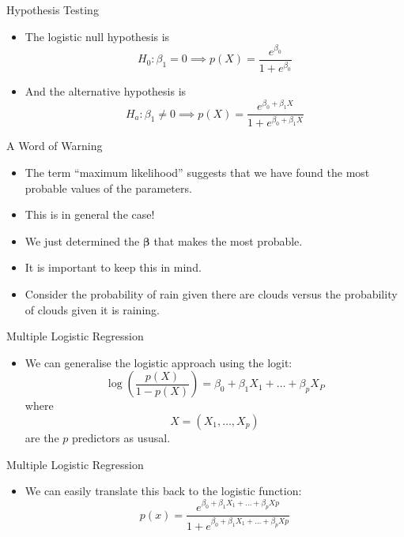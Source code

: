 \documentclass[mathserif, aspectratio=169]{beamer}
\begin{document}
\begin{frame}{Hypothesis Testing}
	\begin{itemize}
		\item The logistic null hypothesis is
			\[ H_0 : \beta_1 = 0 \implies p(X) = \frac{e^{\beta_0}}{1 + e^{\beta_0}} \]
		\item And the alternative hypothesis is
			\[ H_a : \beta_1 \neq 0 \implies p(X) = \frac{e^{\beta_0 + \beta_1 X}}
			{1 + e^{\beta_0 + \beta_1 X}} \]
	\end{itemize}
\end{frame}

\begin{frame}{A Word of Warning}
	\begin{itemize}
		\item The term ``maximum likelihood'' suggests that we have found the most probable values of 
			the parameters.
		\item This is in general  the case!
		\item We just determined the $\bm{\beta}$ that makes the  most probable.
		\item It is important to keep this in mind.
		\item Consider the probability of rain given there are clouds versus the probability of clouds
			given it is raining.
	\end{itemize}
\end{frame}


\begin{frame}{Multiple Logistic Regression}
	\begin{itemize}
		\item We can generalise the logistic approach using the logit:
			\[
				\log\left( \frac{p(X)}{1 - p(X)}\right) =
				\beta_0 + \beta_1 X_1 + \dots + \beta_p X_P
			\]
			where
			\[ X = (X_1, \dots, X_p) \]
			are the $p$ predictors as ususal.
	\end{itemize}
\end{frame}

\begin{frame}{Multiple Logistic Regression}
	\begin{itemize}
		\item We can easily translate this back to the logistic function:
			\[
				p(x) =
				\frac{e^{\beta_0 + \beta_1 X_1 + \dots + \beta_p Xp}}
				{1 + e^{\beta_0 + \beta_1 X_1 + \dots + \beta_p Xp}}
			\]
	\end{itemize}
\end{frame}
\end{document}
